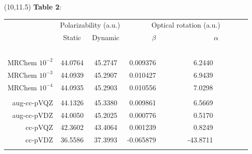 \documentclass[a0,draft,portrait]{a0poster}
\begin{document}
\begin{textblock}{7}(10,11.5)
\footnotesize
\textbf{Table 2}:
\begin{table}
    \normalsize
    \centering
    \begin{tabular}{|r|cc|rr|}
	\hline&
        \multicolumn{2}{c|}{Polarizability (a.u.)}&
        \multicolumn{2}{c|}{Optical rotation (a.u.)}\\
                         & Static        & Dynamic       &
                         \multicolumn{1}{c}{$\beta$}&
                         \multicolumn{1}{c|}{$\alpha$}\\
	\hline
	\hspace{55mm}\   &\hspace{62mm}\ &\hspace{62mm}\ &\hspace{62mm}\ &\hspace{62mm}\ \\
	MRChem $10^{-2}$ & 44.0764       & 45.2747       & 0.009376\ \ \ \ \ \ \ &   6.2440\ \ \ \ \ \ \ \ \ \\
	MRChem $10^{-3}$ & 44.0939       & 45.2907       & 0.010427\ \ \ \ \ \ \ &   6.9439\ \ \ \ \ \ \ \ \ \\
	MRChem $10^{-4}$ & 44.0935       & 45.2903       & 0.010556\ \ \ \ \ \ \ &   7.0298\ \ \ \ \ \ \ \ \ \\
	                 &               &               &                       &                           \\
	aug-cc-pVQZ      & 44.1326       & 45.3380       & 0.009861\ \ \ \ \ \ \ &   6.5669\ \ \ \ \ \ \ \ \ \\
	aug-cc-pVDZ      & 44.0050       & 45.2025       & 0.000776\ \ \ \ \ \ \ &   0.5170\ \ \ \ \ \ \ \ \ \\
	    cc-pVQZ      & 42.3602       & 43.4064       & 0.001239\ \ \ \ \ \ \ &   0.8249\ \ \ \ \ \ \ \ \ \\
	    cc-pVDZ      & 36.5586       & 37.3993       &-0.065879\ \ \ \ \ \ \ & -43.8711\ \ \ \ \ \ \ \ \ \\
	                 &               &               &               &               \\

\end{tabular}
\end{table}
\end{textblock}
\end{document}
